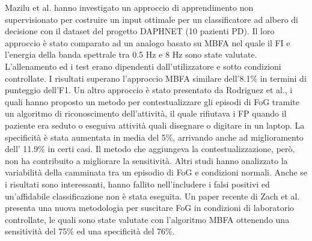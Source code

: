 Mazilu et al.\cite{50} hanno investigato un approccio di apprendimento non supervisionato per costruire un input ottimale per un classificatore ad albero di decisione con il dataset del progetto DAPHNET (10 pazienti PD). Il loro approccio è stato comparato ad un analogo basato su MBFA nel quale il FI e l'energia della banda spettrale tra 0.5 Hz e 8 Hz sono state valutate. L'allenamento ed i test erano dipendenti dall'utilizzatore e sotto condizioni controllate. I risultati superano l'approccio MBFA similare dell'8.1\% in termini di punteggio dell'F1. Un altro approccio è stato presentato da Rodriguez et al., i quali hanno proposto un metodo per contestualizzare gli episodi di FoG tramite un algoritmo di riconoscimento dell'attività, il quale rifiutava i FP quando il paziente era seduto o eseguiva attività quali disegnare o digitare in un laptop. La specificità è stata aumentata in media del 5\%, arrivando anche ad miglioramento dell' 11.9\% in certi casi\cite{50}. Il metodo che aggiungeva la contestualizzazione, però, non ha contribuito a migliorare la sensitività. Altri studi hanno analizzato la variabilità della camminata tra un episodio di FoG e condizioni normali. Anche se i risultati sono interessanti, hanno fallito nell'includere i falsi positivi ed un'affidabile classificazione non è stata eseguita\cite{53,54}. Un paper recente di Zach et al. presenta una nuova metodologia per suscitare FoG in condizioni di laboratorio controllate, le quali sono state valutate con l'algoritmo MBFA ottenendo una sensitività del 75\% ed una specificità del 76\%\cite{31}. \newline
